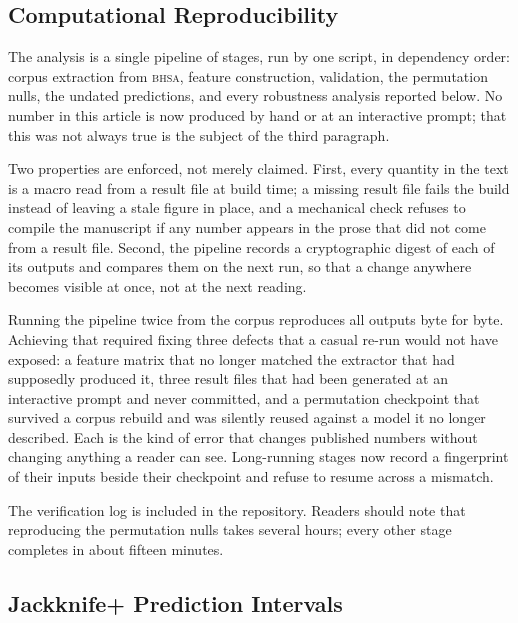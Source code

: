 \documentclass[10pt,letterpaper]{article}
\newcommand{\bhsa}{\textsc{bhsa}}
\begin{document}
\subsection*{Computational Reproducibility}

The analysis is a single pipeline of \NPipeStages{} stages, run by one script,
in dependency order: corpus extraction from \bhsa{}, feature construction,
validation, the permutation nulls, the undated predictions, and every robustness
analysis reported below.  No number in this article is now produced by hand or
at an interactive prompt; that this was not always true is the subject of the
third paragraph.

Two properties are enforced, not merely claimed.  First, every quantity in the
text is a macro read from a result file at build time; a missing result file
fails the build instead of leaving a stale figure in place, and a mechanical
check refuses to compile the manuscript if any number appears in the prose that
did not come from a result file.  Second, the pipeline records a cryptographic
digest of each of its \NPipeOutputs{} outputs and compares them on the next run,
so that a change anywhere becomes visible at once, not at the next reading.

Running the pipeline twice from the corpus reproduces all \NPipeOutputs{}
outputs byte for byte.  Achieving that required fixing three defects that a
casual re-run would not have exposed: a feature matrix that no longer matched
the extractor that had supposedly produced it, three result files that had been
generated at an interactive prompt and never committed, and a permutation
checkpoint that survived a corpus rebuild and was silently reused against a
model it no longer described.  Each is the kind of error that changes published
numbers without changing anything a reader can see.  Long-running stages now
record a fingerprint of their inputs beside their checkpoint and refuse to
resume across a mismatch.

The verification log is included in the repository.  Readers should note that
reproducing the permutation nulls takes several hours; every other stage
completes in about fifteen minutes.

\subsection*{Jackknife+ Prediction Intervals}
\end{document}
